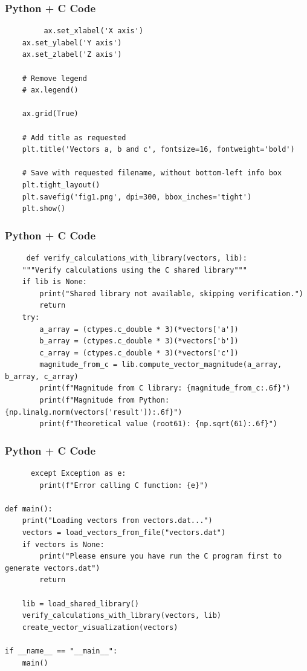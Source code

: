 \documentclass{beamer}
\begin{document}
\begin{frame}[fragile]
    \frametitle{Python + C Code}
    \begin{lstlisting}
         ax.set_xlabel('X axis')
    ax.set_ylabel('Y axis')
    ax.set_zlabel('Z axis')

    # Remove legend
    # ax.legend()

    ax.grid(True)

    # Add title as requested
    plt.title('Vectors a, b and c', fontsize=16, fontweight='bold')

    # Save with requested filename, without bottom-left info box
    plt.tight_layout()
    plt.savefig('fig1.png', dpi=300, bbox_inches='tight')
    plt.show()
    \end{lstlisting}
\end{frame}

\begin{frame}[fragile]
    \frametitle{Python + C Code}
    \begin{lstlisting}
     def verify_calculations_with_library(vectors, lib):
    """Verify calculations using the C shared library"""
    if lib is None:
        print("Shared library not available, skipping verification.")
        return
    try:
        a_array = (ctypes.c_double * 3)(*vectors['a'])
        b_array = (ctypes.c_double * 3)(*vectors['b'])
        c_array = (ctypes.c_double * 3)(*vectors['c'])
        magnitude_from_c = lib.compute_vector_magnitude(a_array, b_array, c_array)
        print(f"Magnitude from C library: {magnitude_from_c:.6f}")
        print(f"Magnitude from Python: {np.linalg.norm(vectors['result']):.6f}")
        print(f"Theoretical value (root61): {np.sqrt(61):.6f}")
    \end{lstlisting}
\end{frame}

\begin{frame}[fragile]
    \frametitle{Python + C Code}
    \begin{lstlisting}
      except Exception as e:
        print(f"Error calling C function: {e}")

def main():
    print("Loading vectors from vectors.dat...")
    vectors = load_vectors_from_file("vectors.dat")
    if vectors is None:
        print("Please ensure you have run the C program first to generate vectors.dat")
        return

    lib = load_shared_library()
    verify_calculations_with_library(vectors, lib)
    create_vector_visualization(vectors)

if __name__ == "__main__":
    main()
    \end{lstlisting}
\end{frame}
\end{document}
